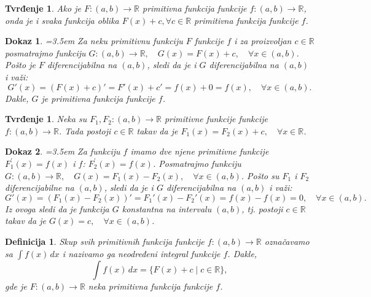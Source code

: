 \documentclass[11pt]{article}
\newcounter{mathitem}
\theoremstyle{plain}
\newtheorem{definicija}[mathitem]{Definicija}
\newtheorem{tvrdjenje}[mathitem]{Tvrđenje}
\theoremstyle{serbnodot}
\newtheorem*{dokaz}{Dokaz}
\begin{document}
\begin{tvrdjenje}
    Ako je $ F:(a,b) \to \mathbb{R} $ primitivna funkcija funkcije $ f:(a,b) \to \mathbb{R} $, onda je i svaka funkcija oblika $ F(x) + c, \forall c \in \mathbb{R} $ primitivna funkcija funkcije $ f $.
\end{tvrdjenje}
\begin{dokaz}
        \par\hangindent=3.5em
      Za neku primitivnu funkciju $ F $ funkcije $ f $ i za proizvoljan $ c \in \mathbb{R} $ posmatrajmo funkciju $ G:(a,b) \to \mathbb{R}, \quad G(x) = F(x) + c, \quad \forall x \in (a,b) $. Pošto je $ F $ diferencijabilna na $ (a,b) $, sledi da je i $ G $ diferencijabilna na $ (a,b) $ i važi:
      \[
        G'(x) = (F(x) + c)' = F'(x) + c' = f(x) + 0 = f(x), \quad \forall x \in (a,b).
      \]
      Dakle, $ G $ je primitivna funkcija funkcije $ f $.
\end{dokaz}


\begin{tvrdjenje}
  Neka su $F_1, F_2:(a,b) \to \mathbb{R} $ primitivne funkcije funkcije $ f:(a,b) \to \mathbb{R} $. Tada postoji $ c \in \mathbb{R} $ takav da je $ F_1(x) = F_2(x) + c, \quad \forall x \in \mathbb{R} $.
\end{tvrdjenje}
\begin{dokaz}
    \par\hangindent=3.5em
    Za funkciju $ f $ imamo dve njene primitivne funkcije $ F_1^{'}(x) = f(x) $ i $f$: $ F_2^{'}(x) = f(x) $. Posmatrajmo funkciju $ G:(a,b) \to \mathbb{R}, \quad G(x) = F_1(x) - F_2(x), \quad \forall x \in (a,b) $. Pošto su $ F_1 $ i $ F_2 $ diferencijabilne na $ (a,b) $, sledi da je i $ G $ diferencijabilna na $ (a,b) $ i važi:
    \[
      G'(x) = (F_1(x) - F_2(x))' = F_1'(x) - F_2'(x) = f(x) - f(x) = 0, \quad \forall x \in (a,b).
    \]
    Iz ovoga sledi da je funkcija $ G $ konstantna na intervalu $ (a,b) $, tj. postoji $ c \in \mathbb{R} $ takav da je $ G(x) = c, \quad \forall x \in (a,b) $.
  \end{dokaz}


\begin{definicija}
  Skup svih primitivnih funkcija funkcije $ f:(a,b) \to \mathbb{R} $ označavamo sa $ \int f(x) \, dx $ i nazivamo ga \emph{neodređeni integral} funkcije $ f $. Dakle,
  \[
    \int f(x) \, dx = \{ F(x) + c \mid c \in \mathbb{R} \},
  \]
  gde je $ F:(a,b) \to \mathbb{R} $ neka primitivna funkcija funkcije $ f $.
\end{definicija}
\end{document}
